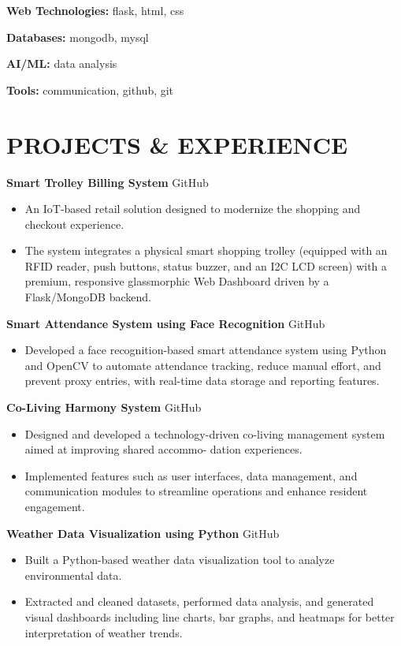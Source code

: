 \documentclass[10pt,a4paper]{extarticle}
\begin{document}
\textbf{Web Technologies:} flask, html, css

\textbf{Databases:} mongodb, mysql

\textbf{AI/ML:} data analysis

\textbf{Tools:} communication, github, git
\\


\section*{PROJECTS \& EXPERIENCE}

\noindent \textbf{Smart Trolley Billing System} \hfill GitHub
\begin{itemize}[leftmargin=*, parsep=0pt, itemsep=1pt, topsep=1pt]
    \item An IoT-based retail solution designed to modernize the shopping and checkout experience.
    \item The system integrates a physical smart shopping trolley (equipped with an RFID reader, push buttons, status buzzer, and an I2C LCD screen) with a premium, responsive glassmorphic Web Dashboard driven by a Flask/MongoDB backend.
\end{itemize}

\noindent \textbf{Smart Attendance System using Face Recognition} \hfill GitHub
\begin{itemize}[leftmargin=*, parsep=0pt, itemsep=1pt, topsep=1pt]
    \item Developed a face recognition-based smart attendance system using Python and OpenCV to automate attendance tracking, reduce manual effort, and prevent proxy entries, with real-time data storage and reporting features.
\end{itemize}

\noindent \textbf{Co-Living Harmony System} \hfill GitHub
\begin{itemize}[leftmargin=*, parsep=0pt, itemsep=1pt, topsep=1pt]
    \item Designed and developed a technology-driven co-living management system aimed at improving shared accommo- dation experiences.
    \item Implemented features such as user interfaces, data management, and communication modules to streamline operations and enhance resident engagement.
\end{itemize}

\noindent \textbf{Weather Data Visualization using Python} \hfill GitHub
\begin{itemize}[leftmargin=*, parsep=0pt, itemsep=1pt, topsep=1pt]
    \item Built a Python-based weather data visualization tool to analyze environmental data.
    \item Extracted and cleaned datasets, performed data analysis, and generated visual dashboards including line charts, bar graphs, and heatmaps for better interpretation of weather trends.
\end{itemize}
\end{document}
